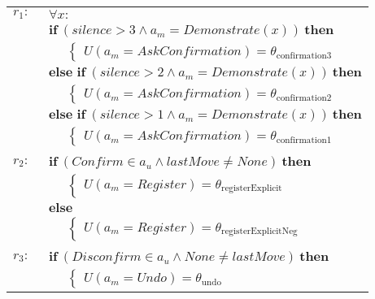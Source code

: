 \begin{footnotesize}
\begin{longtable}{p{1cm}l} 
$r_{1}: \ \ $ &  $\forall x : $ \\ & $\textbf{if} \ (\mathit{silence}\!>\!\mathit{3} \land \mathit{a_m}\!=\!\mathit{Demonstrate}(x)) \ \textbf{then}$ \\
& $\;\;\;\;\; \begin{cases}U(\mathit{a_m}\!=\!\mathit{AskConfirmation})\!=\!\theta_{\mathrm{confirmation3}}\end{cases}$ \\ 
& $\textbf{else if} \ (\mathit{silence}\!>\!\mathit{2} \land \mathit{a_m}\!=\!\mathit{Demonstrate}(x)) \ \textbf{then}$ \\
& $\;\;\;\;\; \begin{cases}U(\mathit{a_m}\!=\!\mathit{AskConfirmation})\!=\!\theta_{\mathrm{confirmation2}}\end{cases}$ \\ 
& $\textbf{else if} \ (\mathit{silence}\!>\!\mathit{1} \land \mathit{a_m}\!=\!\mathit{Demonstrate}(x)) \ \textbf{then}$ \\
& $\;\;\;\;\; \begin{cases}U(\mathit{a_m}\!=\!\mathit{AskConfirmation})\!=\!\theta_{\mathrm{confirmation1}}\end{cases}$ \\ \\[-2mm]
$r_{2}: \ \ $ & $\textbf{if} \ (\mathit{Confirm}\!\in\!\mathit{a_u} \land \mathit{lastMove}\!\neq\!\mathit{None}) \ \textbf{then}$ \\
& $\;\;\;\;\; \begin{cases}U(\mathit{a_m}\!=\!\mathit{Register})\!=\!\theta_{\mathrm{registerExplicit}}\end{cases}$\\ 
& $\textbf{else}$ \\
& $\;\;\;\;\; \begin{cases}U(\mathit{a_m}\!=\!\mathit{Register})\!=\!\theta_{\mathrm{registerExplicitNeg}}\end{cases}$ \\[3mm]\\[-2mm]
$r_{3}: \ \ $& $\textbf{if} \ (\mathit{Disconfirm}\!\in\!\mathit{a_u} \land \mathit{None}\!\neq\!\mathit{lastMove}) \ \textbf{then}$ \\
& $\;\;\;\;\; \begin{cases}U(\mathit{a_m}\!=\!\mathit{Undo})\!=\!\theta_{\mathrm{undo}}\end{cases}$ \\ 

\end{longtable}
\end{footnotesize}
